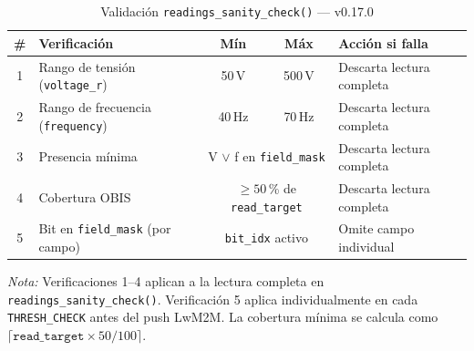 
\begin{table}[htbp]
\centering
\caption{Validación \texttt{readings\_sanity\_check()} — v0.17.0}
\label{tab:sanity-check-v017}
\begin{tabular}{c l c c p{5.5cm}}
\toprule
\textbf{\#} & \textbf{Verificación} & \textbf{Mín} & \textbf{Máx} & \textbf{Acción si falla} \\
\midrule
1 & Rango de tensión (\texttt{voltage\_r})
  & 50\,V & 500\,V
  & Descarta lectura completa \\
2 & Rango de frecuencia (\texttt{frequency})
  & 40\,Hz & 70\,Hz
  & Descarta lectura completa \\
3 & Presencia mínima
  & \multicolumn{2}{c}{V $\lor$ f en \texttt{field\_mask}}
  & Descarta lectura completa \\
4 & Cobertura OBIS
  & \multicolumn{2}{c}{$\geq 50$\,\% de \texttt{read\_target}}
  & Descarta lectura completa \\
\midrule
5 & Bit en \texttt{field\_mask} (por campo)
  & \multicolumn{2}{c}{\texttt{bit\_idx} activo}
  & Omite campo individual \\
\bottomrule
\end{tabular}

\smallskip
\footnotesize
\textit{Nota:} Verificaciones 1--4 aplican a la lectura completa en \texttt{readings\_sanity\_check()}.
Verificación 5 aplica individualmente en cada \texttt{THRESH\_CHECK} antes del push LwM2M.
La cobertura mínima se calcula como $\lceil\texttt{read\_target} \times 50 / 100\rceil$.
\end{table}
